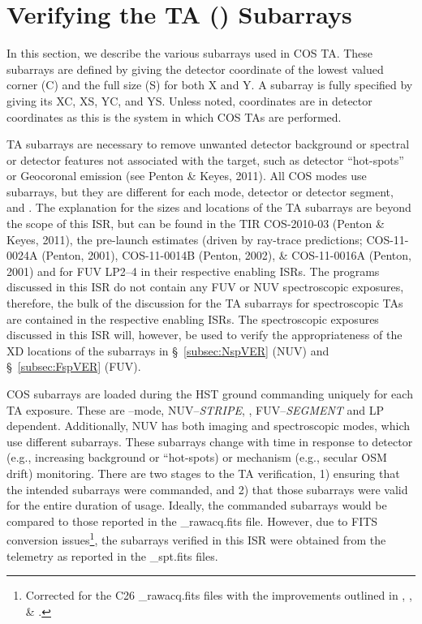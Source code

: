 \section{Verifying the TA (\tacq{}) Subarrays}\label{sec:subarray}
In this section, we describe the various subarrays used in COS TA.
These subarrays are defined by giving the detector coordinate of the lowest valued corner (C) and the full size (S) for both X and Y.
A subarray is fully specified by giving its XC, XS, YC, and YS. Unless noted, coordinates are in detector coordinates as this is the system in which COS TAs are performed.

TA subarrays are necessary to remove unwanted detector background or spectral or detector features not associated with the target, such as detector
``hot-spots'' or Geocoronal emission (see Penton \& Keyes, 2011). All COS \tacq{} modes use subarrays, but they are different for each mode, detector or detector segment,
and \cenwave{}.  The explanation for the sizes and locations of the TA subarrays are beyond the scope of this ISR, but can be found in the TIR COS-2010-03 (Penton \& Keyes, 2011),
the pre-launch estimates (driven by ray-trace predictions; COS-11-0024A (Penton, 2001), COS-11-0014B (Penton, 2002), \& COS-11-0016A (Penton, 2001) and for
FUV LP2--4 in their respective enabling ISRs.
The programs discussed in this ISR do not contain any FUV or NUV spectroscopic \tacq{} exposures, therefore, the bulk of the discussion for the TA subarrays for
spectroscopic TAs are contained in the respective enabling ISRs. The spectroscopic exposures discussed in this ISR will, however, be used to verify
the appropriateness of the XD locations of the subarrays in \S~\ref{subsec:NspVER} (NUV) and \S~\ref{subsec:FspVER} (FUV).

COS subarrays are loaded during the HST ground commanding uniquely for each TA exposure.
These are \tacq{}--mode, NUV--\textit{STRIPE}, \cenwave{}, FUV--\textit{SEGMENT} and LP dependent.
Additionally, NUV  has both imaging and spectroscopic modes, which use different subarrays.
These subarrays change with time in response to detector (e.g., increasing background or ``hot-spots)
or mechanism (e.g., secular OSM drift) monitoring.
There are two stages to the TA verification,
1) ensuring that the intended subarrays were commanded, and
2) that those subarrays were valid for the entire duration of usage.
Ideally, the commanded subarrays would be compared to those reported in the {\sf \_rawacq.fits} file.
However, due to FITS conversion issues\footnote{Corrected for the C26 {\sf \_rawacq.fits} files with the improvements outlined in , , \& .},
the subarrays verified in this ISR were obtained from the telemetry as reported in the {\sf \_spt.fits} files.

